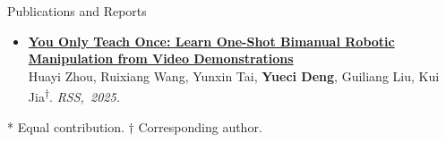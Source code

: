 \begin{rSection}{Publications and Reports}
{\begin{itemize}[leftmargin=1.8em,labelsep=0.5em,itemsep=5pt,topsep=1pt,parsep=0pt]
\item[{\scriptsize\color{cvMuted}1.}] \href{https://arxiv.org/abs/2501.14208}{\textbf{You Only Teach Once: Learn One-Shot Bimanual Robotic Manipulation from Video Demonstrations}}\\[-1pt]
{\color{cvMuted}Huayi Zhou, Ruixiang Wang, Yunxin Tai, \textbf{Yueci Deng}, Guiliang Liu, Kui Jia\textsuperscript{$\dagger$}.} \textit{RSS,~2025.}
\end{itemize}
{\fontsize{8.5}{10}\selectfont\color{cvMuted}* Equal contribution. $\dagger$ Corresponding author.\par}
}
\end{rSection}
